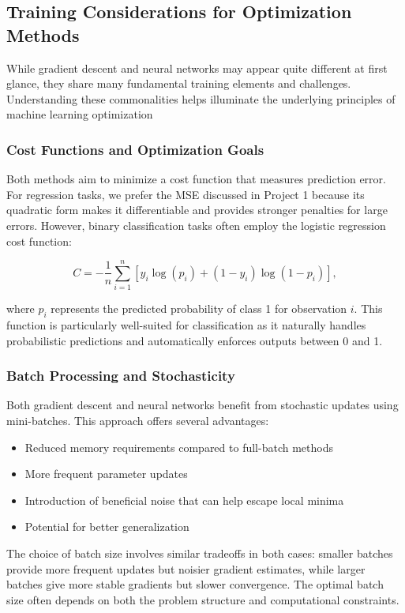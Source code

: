 \documentclass[aps,pra,english,notitlepage,reprint,nofootinbib]{revtex4-1}  %
\begin{document}
\subsection{Training Considerations for Optimization Methods}
While gradient descent and neural networks may appear quite different at first glance, they share many fundamental training elements and challenges. Understanding these commonalities helps illuminate the underlying principles of machine learning optimization

\subsubsection{Cost Functions and Optimization Goals} 
Both methods aim to minimize a cost function that measures prediction error. For regression tasks, we prefer the MSE discussed in Project 1 because its quadratic form makes it differentiable and provides stronger penalties for large errors. However, binary classification tasks often employ the logistic regression cost function:

\begin{equation}
    C = -\frac{1}{n}\sum_{i=1}^n [y_i\log(p_i) + (1-y_i)\log(1-p_i)],
\end{equation}

where \( p_i \) represents the predicted probability of class 1 for observation \( i \). This function is particularly well-suited for classification as it naturally handles probabilistic predictions and automatically enforces outputs between 0 and 1.

\subsubsection{Batch Processing and Stochasticity}
Both gradient descent and neural networks benefit from stochastic updates using mini-batches. This approach offers several advantages:

\begin{itemize}
    \item Reduced memory requirements compared to full-batch methods 
    \item More frequent parameter updates
    \item Introduction of beneficial noise that can help escape local minima
    \item Potential for better generalization
\end{itemize}

The choice of batch size involves similar tradeoffs in both cases: smaller batches provide more frequent updates but noisier gradient estimates, while larger batches give more stable gradients but slower convergence. The optimal batch size often depends on both the problem structure and computational constraints.
\end{document}
